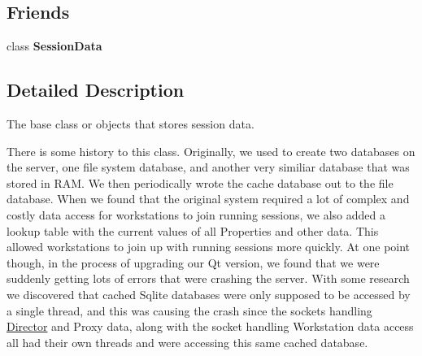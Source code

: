 \subsection*{Friends}
\begin{DoxyCompactItemize}
\item 
\hypertarget{class_session_data_ae15f642c4c4da813b65d94b4a68929dd}{class {\bfseries Session\-Data}}\label{class_session_data_ae15f642c4c4da813b65d94b4a68929dd}

\end{DoxyCompactItemize}


\subsection{Detailed Description}
The base class or objects that stores session data. 

There is some history to this class. Originally, we used to create two databases on the server, one file system database, and another very similiar database that was stored in R\-A\-M. We then periodically wrote the cache database out to the file database. When we found that the original system required a lot of complex and costly data access for workstations to join running sessions, we also added a lookup table with the current values of all Properties and other data. This allowed workstations to join up with running sessions more quickly. At one point though, in the process of upgrading our Qt version, we found that we were suddenly getting lots of errors that were crashing the server. With some research we discovered that cached Sqlite databases were only supposed to be accessed by a single thread, and this was causing the crash since the sockets handling \hyperlink{class_director}{Director} and Proxy data, along with the socket handling Workstation data access all had their own threads and were accessing this same cached database.

